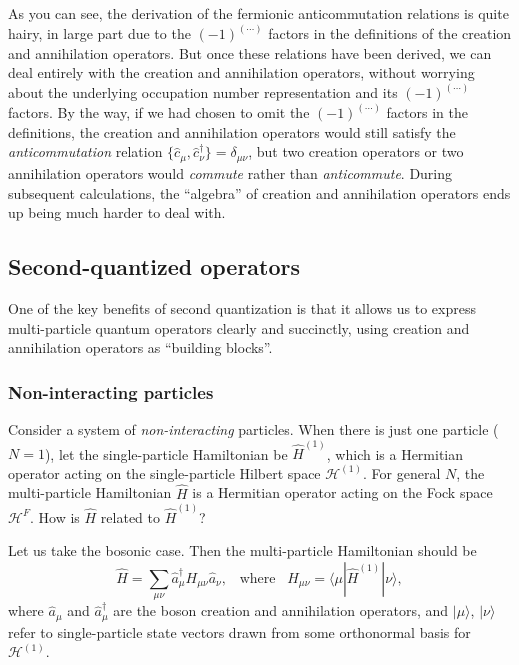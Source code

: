 \documentclass[pra,12pt]{revtex4-2}
\begin{document}
As you can see, the derivation of the fermionic anticommutation
relations is quite hairy, in large part due to the $(-1)^{(\cdots)}$
factors in the definitions of the creation and annihilation operators.
But once these relations have been derived, we can deal entirely with
the creation and annihilation operators, without worrying about the
underlying occupation number representation and its $(-1)^{(\cdots)}$
factors.  By the way, if we had chosen to omit the $(-1)^{(\cdots)}$
factors in the definitions, the creation and annihilation operators
would still satisfy the \textit{anticommutation} relation
$\{\hat{c}_\mu,\hat{c}_\nu^\dagger\}=\delta_{\mu\nu}$, but two
creation operators or two annihilation operators would
\textit{commute} rather than \textit{anticommute}.  During subsequent
calculations, the ``algebra'' of creation and annihilation operators
ends up being much harder to deal with.

\subsection{Second-quantized operators}
\label{sec:second_quant_op}

One of the key benefits of second quantization is that it allows us to
express multi-particle quantum operators clearly and succinctly, using
creation and annihilation operators as ``building blocks''.

\subsubsection{Non-interacting particles}

Consider a system of \textit{non-interacting} particles.  When there
is just one particle ($N=1$), let the single-particle Hamiltonian be
$\hat{H}^{(1)}$, which is a Hermitian operator acting on the
single-particle Hilbert space $\mathscr{H}^{(1)}$.  For general $N$,
the multi-particle Hamiltonian $\hat{H}$ is a Hermitian operator
acting on the Fock space $\mathscr{H}^F$.  How is $\hat{H}$ related to
$\hat{H}^{(1)}$?

Let us take the bosonic case.  Then the multi-particle Hamiltonian
should be
\begin{equation}
  \hat{H} = \sum_{\mu\nu} \hat{a}^\dagger_\mu H_{\mu\nu} \hat{a}_\nu,
  \;\;\; \mathrm{where}\;\;\;
  H_{\mu\nu} = \langle\mu|\hat{H}^{(1)}|\nu\rangle,
  \label{twobosonH}
\end{equation}
where $\hat{a}_\mu$ and $\hat{a}_\mu^\dagger$ are the boson creation
and annihilation operators, and $|\mu\rangle$, $|\nu\rangle$ refer to
single-particle state vectors drawn from some orthonormal basis for
$\mathscr{H}^{(1)}$.
\end{document}
